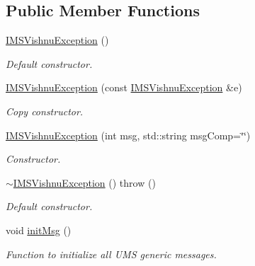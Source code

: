 \subsection*{Public Member Functions}
\begin{DoxyCompactItemize}
\item 
\hypertarget{classIMSVishnuException_ae0a05df539e5fc2e4bbb60cdd1a8bdbe}{
\hyperlink{classIMSVishnuException_ae0a05df539e5fc2e4bbb60cdd1a8bdbe}{IMSVishnuException} ()}
\label{classIMSVishnuException_ae0a05df539e5fc2e4bbb60cdd1a8bdbe}

\begin{DoxyCompactList}\small\item\em Default constructor. \item\end{DoxyCompactList}\item 
\hypertarget{classIMSVishnuException_a929e0c4298504b04ff6e5631e27f9447}{
\hyperlink{classIMSVishnuException_a929e0c4298504b04ff6e5631e27f9447}{IMSVishnuException} (const \hyperlink{classIMSVishnuException}{IMSVishnuException} \&e)}
\label{classIMSVishnuException_a929e0c4298504b04ff6e5631e27f9447}

\begin{DoxyCompactList}\small\item\em Copy constructor. \item\end{DoxyCompactList}\item 
\hypertarget{classIMSVishnuException_af8dd58535469e831663d808cb39b5188}{
\hyperlink{classIMSVishnuException_af8dd58535469e831663d808cb39b5188}{IMSVishnuException} (int msg, std::string msgComp=\char`\"{}\char`\"{})}
\label{classIMSVishnuException_af8dd58535469e831663d808cb39b5188}

\begin{DoxyCompactList}\small\item\em Constructor. \item\end{DoxyCompactList}\item 
\hypertarget{classIMSVishnuException_a6a76a06ef20bd443a00ef57b5441d8b6}{
\hyperlink{classIMSVishnuException_a6a76a06ef20bd443a00ef57b5441d8b6}{$\sim$IMSVishnuException} ()  throw ()}
\label{classIMSVishnuException_a6a76a06ef20bd443a00ef57b5441d8b6}

\begin{DoxyCompactList}\small\item\em Default constructor. \item\end{DoxyCompactList}\item 
\hypertarget{classIMSVishnuException_a9d59bcf2fe80770a4cdc88d5e91d2476}{
void \hyperlink{classIMSVishnuException_a9d59bcf2fe80770a4cdc88d5e91d2476}{initMsg} ()}
\label{classIMSVishnuException_a9d59bcf2fe80770a4cdc88d5e91d2476}

\begin{DoxyCompactList}\small\item\em Function to initialize all UMS generic messages. \item\end{DoxyCompactList}\end{DoxyCompactItemize}


